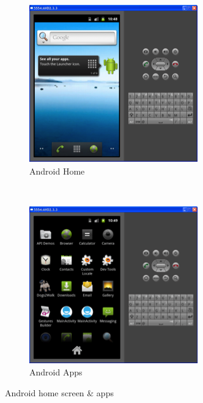 \documentclass[12pt, a4paper, twoside]{book}
\begin{document}
\begin{figure}[H]%
\centering
    \begin{subfigure}[b]{0.45\textwidth}
        \includegraphics[width=\textwidth]{images/android_home}
        \caption{Android Home}
        \label{fig:android-home}
    \end{subfigure}
    ~ 
    \begin{subfigure}[b]{0.45\textwidth}
        \includegraphics[width=\textwidth]{images/android_apps}
        \caption{Android Apps}
        \label{fig:android-apps}
    \end{subfigure}
\caption{Android home screen \& apps}
\label{fig:android-home-apps}
\end{figure}
\end{document}
